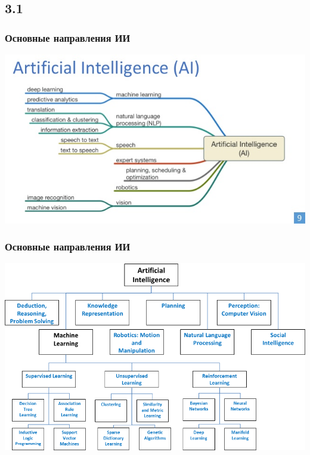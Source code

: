 \documentclass[default]{beamer}
\begin{document}
	\subsection{3.1}
	\begin{frame}
		\frametitle{Основные направления ИИ}
		\centering
		\includegraphics[width=\textwidth]{ai_fields.jpg}
	\end{frame}

	\begin{frame}
		\frametitle{Основные направления ИИ}
		\centering
		\includegraphics[width=\textwidth]{ai_fields3.png}
	\end{frame}
\end{document}
